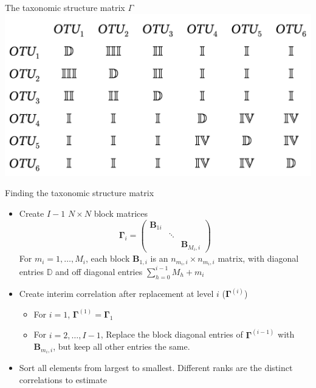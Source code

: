 \documentclass{beamer}
\begin{document}


\begin{frame}[t]{The taxonomic structure matrix $\Gamma$}
  \includegraphics[width = \textwidth]{Gamma.png}
\end{frame}




\begin{frame}[t]{Finding the taxonomic structure matrix}
  \begin{itemize}
    \item Create $I-1$ $N\times N$ block matrices
    $$\boldsymbol\Gamma_i = \begin{pmatrix}
          \boldsymbol B_{1i} & & \\
          & \ddots & \\
          & & \boldsymbol B_{M_i,i}
    \end{pmatrix}$$
    For $m_i = 1, \ldots , M_i$, each block $\boldsymbol B_{1,i}$ is an $n_{m_i,i} \times n_{m_i,i}$ matrix, with diagonal entries $\mathbb{D}$ and off diagonal entries $\sum_{h=0}^{i-1}M_h + m_i$
    \item Create interim correlation after replacement at level $i$ ($\boldsymbol\Gamma^{(i)}$)
    \begin{itemize}
      \item For $i = 1$, $\boldsymbol\Gamma^{(1)} = \boldsymbol\Gamma_1$
      \item For $i = 2, \ldots , I-1$, Replace the block diagonal entries of $\boldsymbol\Gamma^{(i-1)}$ with $\boldsymbol B_{m_i,i}$, but keep all other entries the same.
    \end{itemize}
    \item Sort all elements from largest to smallest. Different ranks are the distinct correlations to estimate
  \end{itemize}
\end{frame}
\end{document}
